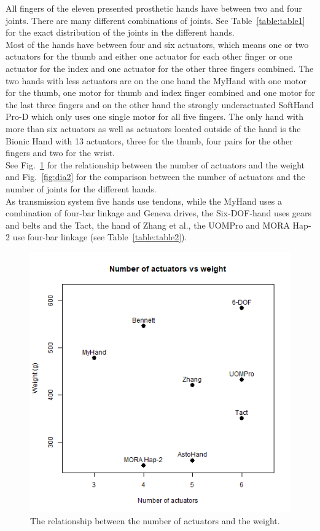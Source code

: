 \documentclass[a4paper, 10pt, conference]{ieeeconf}      %
\begin{document}
All fingers of the eleven presented prosthetic hands have between two and four joints. There are many different combinations of joints. See Table~\ref{table:table1} for the exact distribution of the joints in the different hands.\\
Most of the hands have between four and six actuators, which means one or two actuators for the thumb and either one actuator for each other finger or one actuator for the index and one actuator for the other three fingers combined. The two hands with less actuators are on the one hand the MyHand with one motor for the thumb, one motor for thumb and index finger combined and one motor for the last three fingers and on the other hand the strongly underactuated SoftHand Pro-D which only uses one single motor for all five fingers. The only hand with more than six actuators as well as actuators located outside of the hand is the Bionic Hand with 13 actuators, three for the thumb, four pairs for the other fingers and two for the wrist.\\
See Fig.~\ref{fig:dia1} for the relationship between the number of actuators and the weight and Fig.~\ref{fig:dia2} for the comparison between the number of actuators and the number of joints for the different hands.\\
As transmission system five hands use tendons, while the MyHand uses a combination of four-bar linkage and Geneva drives, the Six-DOF-hand uses gears and belts and the Tact, the hand of Zhang et al., the UOMPro and MORA Hap-2 use four-bar linkage (see Table~\ref{table:table2}).

\begin{figure}[h]

	\centering
	\includegraphics[scale=0.45]{images/weight-act}
	
	\caption{The relationship between the number of actuators and the weight.}
	\label{fig:dia1}
\end{figure}
\end{document}
